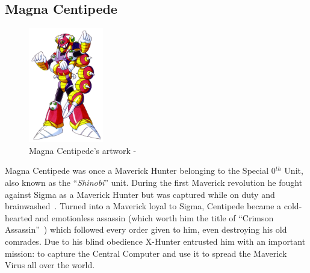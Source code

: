 \subsection{Magna Centipede}\label{boss:Magna_centipede}
\begin{figure}[htp]
	\centering
	\includegraphics[height=5cm]{figures/X2/Magna_centipede/Magna_Centipede.png}
	\caption{Magna Centipede's artwork - \cite{book:MMX_Complete_art}}
\end{figure}
Magna Centipede was once a Maverick Hunter belonging to the Special 0$^{th}$ Unit, also known as the ``\textit{Shinobi}'' unit. During the first Maverick revolution he fought against Sigma as a Maverick Hunter but was captured while on duty and brainwashed~\cite{wayback:X2_resources}. Turned into a Maverick loyal to Sigma, Centipede became a cold-hearted and emotionless assassin (which worth him the title of ``Crimson Assassin''~\cite{book:MMX_Complete_art}) which followed every order given to him, even destroying his old comrades. Due to his blind obedience X-Hunter entrusted him with an important mission: to capture the Central Computer and use it to spread the Maverick Virus all over the world.
